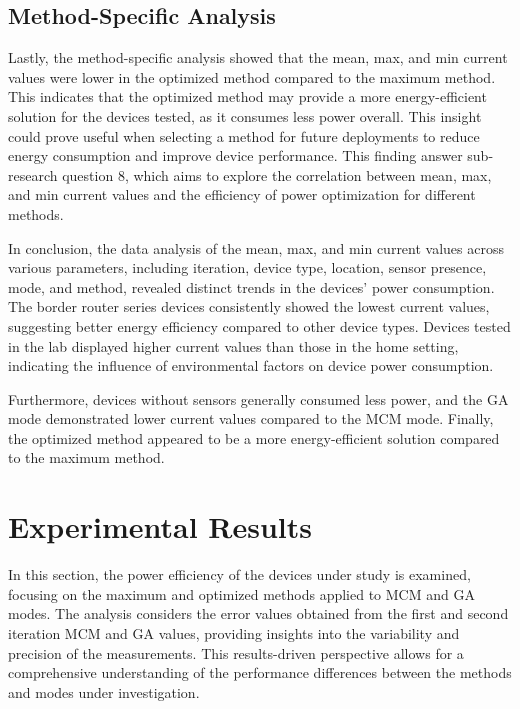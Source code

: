 \subsection{Method-Specific Analysis}

Lastly, the method-specific analysis showed that the mean, max, and min current values were lower in the optimized method compared to the maximum method. This indicates that the optimized method may provide a more energy-efficient solution for the devices tested, as it consumes less power overall. This insight could prove useful when selecting a method for future deployments to reduce energy consumption and improve device performance. This finding answer sub-research question 8, which aims to explore the correlation between mean, max, and min current values and the efficiency of power optimization for different methods.

\vspace{3mm}
In conclusion, the data analysis of the mean, max, and min current values across various parameters, including iteration, device type, location, sensor presence, mode, and method, revealed distinct trends in the devices' power consumption. The border router series devices consistently showed the lowest current values, suggesting better energy efficiency compared to other device types. Devices tested in the lab displayed higher current values than those in the home setting, indicating the influence of environmental factors on device power consumption.

Furthermore, devices without sensors generally consumed less power, and the \gls{GA} mode demonstrated lower current values compared to the \gls{MCM} mode. Finally, the optimized method appeared to be a more energy-efficient solution compared to the maximum method.


\section{Experimental Results}

In this section, the power efficiency of the devices under study is examined, focusing on the maximum and optimized methods applied to \gls{MCM} and \gls{GA} modes. The analysis considers the error values obtained from the first and second iteration \gls{MCM} and \gls{GA} values, providing insights into the variability and precision of the measurements. This results-driven perspective allows for a comprehensive understanding of the performance differences between the methods and modes under investigation.

